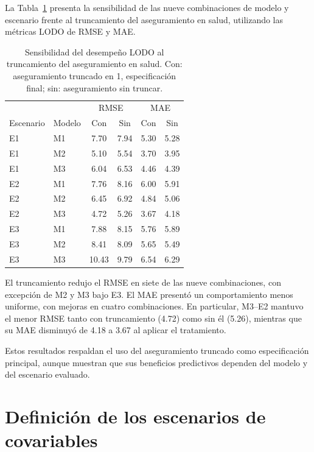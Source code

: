 La Tabla~\ref{tab:sensibilidad-capado} presenta la sensibilidad de las nueve combinaciones de modelo y escenario frente al truncamiento del aseguramiento en salud, utilizando las métricas LODO de RMSE y MAE.

\begin{table}[!htbp]
\centering
\small
\caption{Sensibilidad del desempeño LODO al truncamiento del aseguramiento en salud. Con: aseguramiento truncado en 1, especificación final; sin: aseguramiento sin truncar.}
\label{tab:sensibilidad-capado}
\renewcommand{\arraystretch}{1.2}
\setlength{\tabcolsep}{6pt}
\begin{tabular}{l l c c c c}
\hline
 & & \multicolumn{2}{c}{RMSE} & \multicolumn{2}{c}{MAE} \\
Escenario & Modelo & Con & Sin & Con & Sin \\
\hline
E1 & M1 & 7.70 & 7.94 & 5.30 & 5.28 \\
E1 & M2 & 5.10 & 5.54 & 3.70 & 3.95 \\
E1 & M3 & 6.04 & 6.53 & 4.46 & 4.39 \\
E2 & M1 & 7.76 & 8.16 & 6.00 & 5.91 \\
E2 & M2 & 6.45 & 6.92 & 4.84 & 5.06 \\
E2 & M3 & 4.72 & 5.26 & 3.67 & 4.18 \\
E3 & M1 & 7.88 & 8.15 & 5.76 & 5.89 \\
E3 & M2 & 8.41 & 8.09 & 5.65 & 5.49 \\
E3 & M3 & 10.43 & 9.79 & 6.54 & 6.29 \\
\hline
\end{tabular}
\end{table}

El truncamiento redujo el RMSE en siete de las nueve combinaciones, con excepción de M2 y M3 bajo E3. El MAE presentó un comportamiento menos uniforme, con mejoras en cuatro combinaciones. En particular, M3--E2 mantuvo el menor RMSE tanto con truncamiento (4.72) como sin él (5.26), mientras que su MAE disminuyó de 4.18 a 3.67 al aplicar el tratamiento.

Estos resultados respaldan el uso del aseguramiento truncado como especificación principal, aunque muestran que sus beneficios predictivos dependen del modelo y del escenario evaluado.

\section{Definición de los escenarios de covariables}
\label{sec:res-escenarios}

